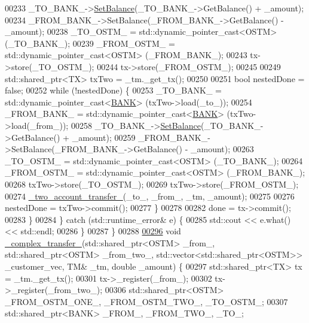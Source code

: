 \begin{DoxyCode}
00233             \_TO\_BANK\_->\hyperlink{class_b_a_n_k_a43bef9f486c88a2dc4906eee0e38a394}{SetBalance}(\_TO\_BANK\_->GetBalance() + \_amount);
00234             \_FROM\_BANK\_->SetBalance(\_FROM\_BANK\_->GetBalance() - \_amount);
00238             \_TO\_OSTM\_ = std::dynamic\_pointer\_cast<OSTM> (\_TO\_BANK\_);
00239             \_FROM\_OSTM\_ = std::dynamic\_pointer\_cast<OSTM> (\_FROM\_BANK\_);
00243             tx->store(\_TO\_OSTM\_);
00244             tx->store(\_FROM\_OSTM\_);
00245 
00249             std::shared\_ptr<TX> txTwo = \_tm.\_get\_tx();
00250 
00251             \textcolor{keywordtype}{bool} nestedDone = \textcolor{keyword}{false};
00252             \textcolor{keywordflow}{while} (!nestedDone) \{
00253                 \_TO\_BANK\_ = std::dynamic\_pointer\_cast<\hyperlink{class_b_a_n_k}{BANK}> (txTwo->load(\_to\_));
00254                 \_FROM\_BANK\_ = std::dynamic\_pointer\_cast<\hyperlink{class_b_a_n_k}{BANK}> (txTwo->load(\_from\_));
00258                 \_TO\_BANK\_->\hyperlink{class_b_a_n_k_a43bef9f486c88a2dc4906eee0e38a394}{SetBalance}(\_TO\_BANK\_->GetBalance() + \_amount);
00259                 \_FROM\_BANK\_->SetBalance(\_FROM\_BANK\_->GetBalance() - \_amount);
00263                 \_TO\_OSTM\_ = std::dynamic\_pointer\_cast<OSTM> (\_TO\_BANK\_);
00264                 \_FROM\_OSTM\_ = std::dynamic\_pointer\_cast<OSTM> (\_FROM\_BANK\_);
00268                 txTwo->store(\_TO\_OSTM\_);
00269                 txTwo->store(\_FROM\_OSTM\_);
00274                 \hyperlink{main_8cpp_a83aef8c5b69afef4e38d14c17fe782b3}{\_two\_account\_transfer\_}(\_to\_, \_from\_, \_tm, \_amount);
00275 
00276                 nestedDone = txTwo->commit();
00277             \}
00278 
00282             done = tx->commit();
00283         \}
00284     \} \textcolor{keywordflow}{catch} (std::runtime\_error& e) \{
00285         std::cout << e.what() << std::endl;
00286     \}
00287 \}
00288 
\hypertarget{main_8cpp_source.tex_l00296}{}\hyperlink{main_8cpp_a0099d241c74532abfb1baae50a52da52}{00296} \textcolor{keywordtype}{void} \hyperlink{main_8cpp_a0099d241c74532abfb1baae50a52da52}{\_complex\_transfer\_}(std::shared\_ptr<OSTM> \_from\_, std::shared\_ptr<OSTM> \_from\_two\_, 
      std::vector<std::shared\_ptr<OSTM>> \_customer\_vec, TM& \_tm, \textcolor{keywordtype}{double} \_amount) \{
00297     std::shared\_ptr<TX> tx = \_tm.\_get\_tx();
00301     tx->\_register(\_from\_);
00302     tx->\_register(\_from\_two\_);
00306     std::shared\_ptr<OSTM> \_FROM\_OSTM\_ONE\_, \_FROM\_OSTM\_TWO\_, \_TO\_OSTM\_;
00307     std::shared\_ptr<BANK> \_FROM\_, \_FROM\_TWO\_, \_TO\_;

\end{DoxyCode}
